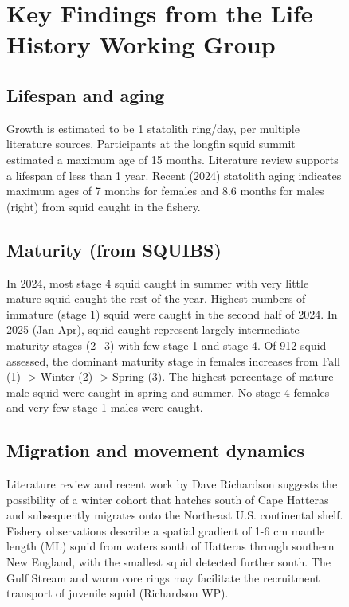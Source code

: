 \documentclass[
  9pt,
  letterpaper,
  DIV=11,
  numbers=noendperiod]{scrartcl}
\begin{document}
\begin{figure}

\begin{minipage}{0.57\linewidth}

\vspace{0.5cm}
\raggedright
\section{Key Findings from the Life History Working Group}

\subsection{Lifespan and aging}

Growth is estimated to be 1 statolith ring/day, per multiple literature
sources. Participants at the longfin squid summit estimated a maximum
age of 15 months. Literature review supports a lifespan of less than 1
year. Recent (2024) statolith aging indicates maximum ages of 7 months
for females and 8.6 months for males (right) from squid caught in the
fishery.

\vspace{0.25cm}

\subsection{Maturity (from SQUIBS)}

In 2024, most stage 4 squid caught in summer with very little mature
squid caught the rest of the year. Highest numbers of immature (stage 1)
squid were caught in the second half of 2024. In 2025 (Jan-Apr), squid
caught represent largely intermediate maturity stages (2+3) with few
stage 1 and stage 4. Of 912 squid assessed, the dominant maturity stage
in females increases from Fall (1) -\textgreater{} Winter (2)
-\textgreater{} Spring (3). The highest percentage of mature male squid
were caught in spring and summer. No stage 4 females and very few stage
1 males were caught.

\vspace{0.25cm}

\subsection{Migration and movement dynamics}

Literature review and recent work by Dave Richardson suggests the
possibility of a winter cohort that hatches south of Cape Hatteras and
subsequently migrates onto the Northeast U.S. continental shelf. Fishery
observations describe a spatial gradient of 1-6 cm mantle length (ML)
squid from waters south of Hatteras through southern New England, with
the smallest squid detected further south. The Gulf Stream and warm core
rings may facilitate the recruitment transport of juvenile squid
(Richardson WP).


\end{minipage}
\end{figure}
\end{document}
